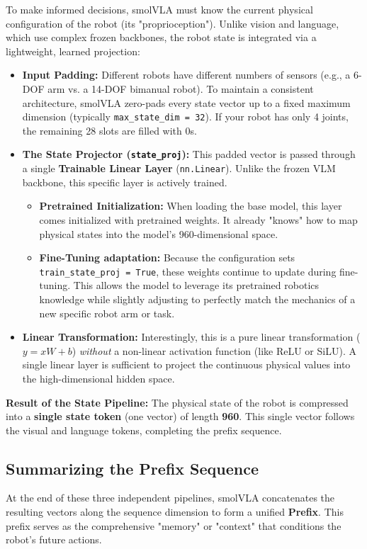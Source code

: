 \documentclass[11pt,a4paper]{article}
\begin{document}
To make informed decisions, smolVLA must know the current physical configuration of the robot (its "proprioception"). Unlike vision and language, which use complex frozen backbones, the robot state is integrated via a lightweight, learned projection:
\begin{itemize}
    \item \textbf{Input Padding:} Different robots have different numbers of sensors (e.g., a 6-DOF arm vs. a 14-DOF bimanual robot). To maintain a consistent architecture, smolVLA zero-pads every state vector up to a fixed maximum dimension (typically \texttt{max\_state\_dim = 32}). If your robot has only 4 joints, the remaining 28 slots are filled with $0$s.
    \item \textbf{The State Projector (\texttt{state\_proj}):} This padded vector is passed through a single \textbf{Trainable Linear Layer} (\texttt{nn.Linear}). Unlike the frozen VLM backbone, this specific layer is actively trained. 
    \begin{itemize}
        \item \textbf{Pretrained Initialization:} When loading the base model, this layer comes initialized with pretrained weights. It already "knows" how to map physical states into the model's 960-dimensional space.
        \item \textbf{Fine-Tuning adaptation:} Because the configuration sets \texttt{train\_state\_proj = True}, these weights continue to update during fine-tuning. This allows the model to leverage its pretrained robotics knowledge while slightly adjusting to perfectly match the mechanics of a new specific robot arm or task.
    \end{itemize}
    \item \textbf{Linear Transformation:} Interestingly, this is a pure linear transformation (\(y = xW + b\)) \textit{without} a non-linear activation function (like ReLU or SiLU). A single linear layer is sufficient to project the continuous physical values into the high-dimensional hidden space.
\end{itemize}

\textbf{Result of the State Pipeline:} The physical state of the robot is compressed into a \textbf{single state token} (one vector) of length \textbf{960}. This single vector follows the visual and language tokens, completing the prefix sequence. 

\subsection{Summarizing the Prefix Sequence}
At the end of these three independent pipelines, smolVLA concatenates the resulting vectors along the sequence dimension to form a unified \textbf{Prefix}. This prefix serves as the comprehensive "memory" or "context" that conditions the robot's future actions.
\end{document}
